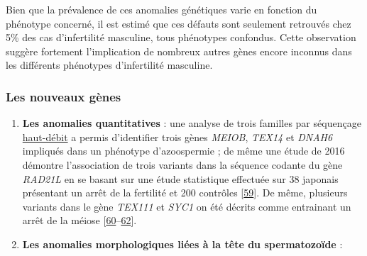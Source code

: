 \documentclass[12pt,twoside]{ugathesis}
\theoremstyle{definition}
\theoremstyle{definition}
\theoremstyle{remark}
\begin{document}
Bien que la prévalence de ces anomalies génétiques varie en fonction du
phénotype concerné, il est estimé que ces défauts sont seulement
retrouvés chez 5\% des cas d'infertilité masculine, tous phénotypes
confondus. Cette observation suggère fortement l'implication de nombreux
autres gènes encore inconnus dans les différents phénotypes
d'infertilité masculine.

\newpage

\subsubsection{Les nouveaux gènes}\label{les-nouveaux-genes}

\begin{enumerate}
\def\labelenumi{\arabic{enumi}.}
\item
  \textbf{Les anomalies quantitatives} : une analyse de trois familles
  par séquençage \protect\hyperlink{ngs}{haut-débit} a permis
  d'identifier trois gènes \emph{MEIOB}, \emph{TEX14} et \emph{DNAH6}
  impliqués dans un phénotype d'azoospermie ; de même une étude de 2016
  démontre l'association de trois variants dans la séquence codante du
  gène \emph{RAD21L} en se basant sur une étude statistique effectuée
  sur 38 japonais présentant un arrêt de la fertilité et 200 contrôles
  {[}\protect\hyperlink{ref-Minase2017}{59}{]}. De même, plusieurs
  variants dans le gène \emph{TEX111} et \emph{SYC1} on été décrits
  comme entrainant un arrêt de la méiose
  {[}\protect\hyperlink{ref-Yatsenko2015}{60}--\protect\hyperlink{ref-Maor-Sagie2015}{62}{]}.
\item
  \textbf{Les anomalies morphologiques liées à la tête du spermatozoïde}
  :


\end{enumerate}
\end{document}
